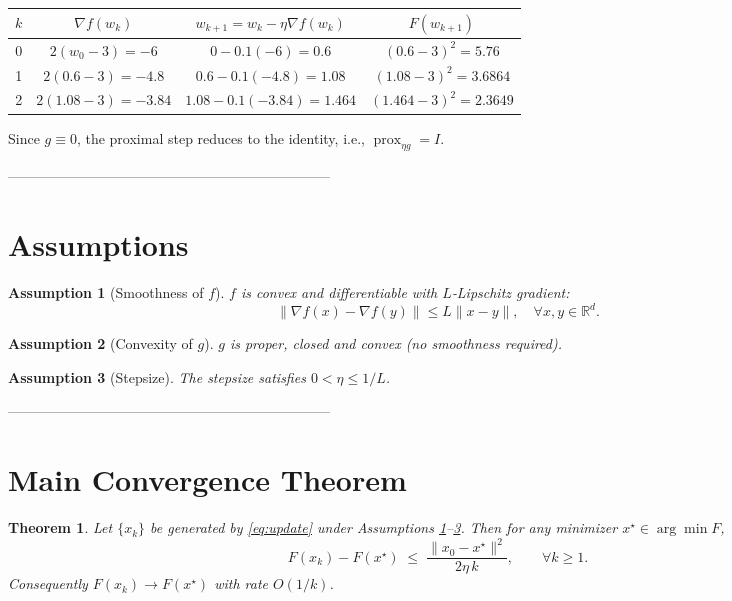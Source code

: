 \documentclass{article}
\newtheorem{theorem}{Theorem}
\newtheorem{assumption}{Assumption}
\newcommand{\prox}{\operatorname{prox}}
\newcommand{\grad}{\nabla}
\newcommand{\R}{\mathbb{R}}
\begin{document}
\begin{center}
\begin{tabular}{c|c|c|c}
$k$ & $\grad f(w_{k})$ & $w_{k+1}=w_{k}-\eta\grad f(w_{k})$ & $F(w_{k+1})$\\\hline
0 & $2(w_{0}-3)=-6$ & $0-0.1(-6)=0.6$ & $(0.6-3)^{2}=5.76$\\
1 & $2(0.6-3)=-4.8$ & $0.6-0.1(-4.8)=1.08$ & $(1.08-3)^{2}=3.6864$\\
2 & $2(1.08-3)=-3.84$ & $1.08-0.1(-3.84)=1.464$ & $(1.464-3)^{2}=2.3649$\\
\end{tabular}
\end{center}
Since $g\equiv0$, the proximal step reduces to the identity, i.e., $\prox_{\eta g}=I$.

---------------------------------------------------------------------

\section*{Assumptions}
\begin{assumption}[Smoothness of $f$]\label{as:lip}
$f$ is convex and differentiable with $L$‑Lipschitz gradient:
\[
\|\grad f(x)-\grad f(y)\|\le L\|x-y\|,\quad\forall x,y\in\R^{d}.
\]
\end{assumption}
\begin{assumption}[Convexity of $g$]\label{as:conv}
$g$ is proper, closed and convex (no smoothness required).
\end{assumption}
\begin{assumption}[Stepsize]\label{as:step}
The stepsize satisfies $0<\eta\le 1/L$.
\end{assumption}

---------------------------------------------------------------------

\section*{Main Convergence Theorem}
\begin{theorem}\label{thm:rate}
Let $\{x_{k}\}$ be generated by \eqref{eq:update} under Assumptions \ref{as:lip}–\ref{as:step}. Then for any minimizer $x^{\star}\in\arg\min F$,
\[
F(x_{k})-F(x^{\star})
\;\le\;
\frac{\|x_{0}-x^{\star}\|^{2}}{2\eta\,k},
\qquad\forall k\ge 1.
\]
Consequently $F(x_{k})\to F(x^{\star})$ with rate $O(1/k)$.
\end{theorem}
\end{document}
